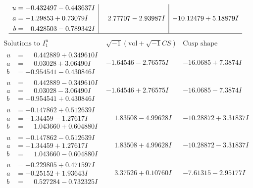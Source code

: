 \documentclass[1p]{elsarticle_modified}
\theoremstyle{definition}
\newcommand{\I}{\sqrt{-1}}
\begin{document}
$$\begin{array}{c|c|c}
\begin{aligned}
u &= -0.432497 - 0.443637 I \\
a &= -1.29853 + 0.73079 I \\
b &= \phantom{-}0.428503 - 0.789342 I\end{aligned}
 & \phantom{-}2.77707 - 2.93987 I & -10.12479 + 5.18879 I\\
 \hline 
 \end{array}$$\newpage$$\begin{array}{c|c|c}  
\text{Solutions to }I^u_{1}& \I (\text{vol} + \sqrt{-1}CS) & \text{Cusp shape}\\
 \hline 
\begin{aligned}
u &= \phantom{-}0.442889 + 0.349610 I \\
a &= \phantom{-}0.03028 + 3.06490 I \\
b &= -0.954541 - 0.430846 I\end{aligned}
 & -1.64546 - 2.76575 I & -16.0685 + 7.3874 I \\ \hline\begin{aligned}
u &= \phantom{-}0.442889 - 0.349610 I \\
a &= \phantom{-}0.03028 - 3.06490 I \\
b &= -0.954541 + 0.430846 I\end{aligned}
 & -1.64546 + 2.76575 I & -16.0685 - 7.3874 I \\ \hline\begin{aligned}
u &= -0.147862 + 0.512639 I \\
a &= -1.34459 - 1.27617 I \\
b &= \phantom{-}1.043660 + 0.604880 I\end{aligned}
 & \phantom{-}1.83508 - 4.99628 I & -10.28872 + 3.31837 I \\ \hline\begin{aligned}
u &= -0.147862 - 0.512639 I \\
a &= -1.34459 + 1.27617 I \\
b &= \phantom{-}1.043660 - 0.604880 I\end{aligned}
 & \phantom{-}1.83508 + 4.99628 I & -10.28872 - 3.31837 I \\ \hline\begin{aligned}
u &= -0.229805 + 0.471597 I \\
a &= -0.25152 + 1.93643 I \\
b &= \phantom{-}0.527284 - 0.732325 I\end{aligned}
 & \phantom{-}3.37526 + 0.10760 I & -7.61315 - 2.95177 I \\ \hline\begin{aligned}

\end{aligned}
\end{array}$$
\end{document}
